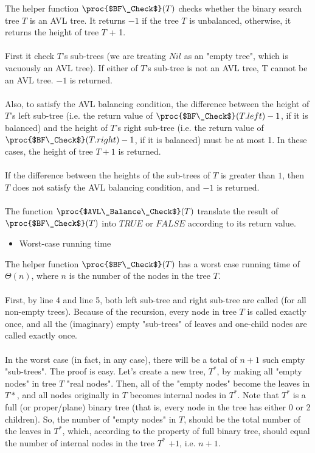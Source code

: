 \documentclass[11pt, answers]{exam}
\theoremstyle{plain}
\theoremstyle{definition}
\begin{document}
\begin{questions}
\begin{solution}
The helper function $\proc{$BF\_Check$}(T)$ checks whether the binary search tree $T$ is an AVL tree. It returns $-1$ if the tree $T$ is unbalanced, otherwise, it returns the height of tree $T$ + 1.\\
\\
First it check $T$'s sub-trees (we are treating $Nil$ as an "empty tree", which is vacuously an AVL tree). If either of $T$'s sub-tree is not an AVL tree, T cannot be an AVL tree. $-1$ is returned.\\
\\
Also, to satisfy the AVL balancing condition, the difference between the height of $T$'s left sub-tree (i.e. the return value of $\proc{$BF\_Check$}(T.left)-1$, if it is balanced) and the height of $T$'s right sub-tree (i.e. the return value of $\proc{$BF\_Check$}(T.right)-1$, if it is balanced) must be at most 1. In these cases, the height of tree $T + 1$ is returned. \\
\\
If the difference between the heights of the sub-trees of $T$ is greater than $1$, then $T$ does not satisfy the AVL balancing condition, and $-1$ is returned.\\
\\
The function $\proc{$AVL\_Balance\_Check$}(T)$ translate the result of $\proc{$BF\_Check$}(T)$ into $TRUE$ or $FALSE$ according to its return value.\\
\begin{itemize}
\item Worst-case running time
\end{itemize}
The helper function $\proc{$BF\_Check$}(T)$ has a worst case running time of $\Theta(n)$, where $n$ is the number of the nodes in the tree $T$.\\
\\
First, by line 4 and line 5, both left sub-tree and right sub-tree are called (for all non-empty trees). Because of the recursion, every node in tree $T$ is called exactly once, and all the (imaginary) empty "sub-trees" of leaves and one-child nodes are called exactly once.\\
\\
In the worst case (in fact, in any case), there will be a total of $n+1$ such empty "sub-trees". The proof is easy. Let's create a new tree, $T^*$, by making all "empty nodes" in tree $T$ "real nodes". Then, all of the "empty nodes" become the leaves in $T*$, and all nodes originally in $T$ becomes internal nodes in $T^*$. Note that $T^*$ is a full (or proper/plane) binary tree (that is, every node in the tree has either 0 or 2 children). So, the number of "empty nodes" in $T$, should be the total number of the leaves in $T^*$, which, according to the property of full binary tree, should equal the number of internal nodes in the tree $T^*$ $+1$, i.e. $n+1$.\\

\end{solution}
\end{questions}
\end{document}
